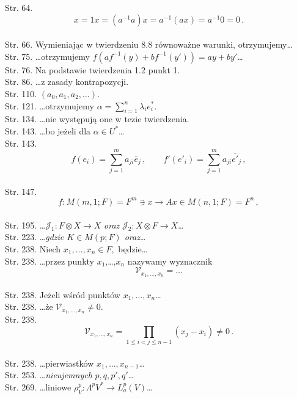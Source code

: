 \documentclass[a4paper,11pt]{article}
\begin{document}
Str. 64.
  $$x = 1 x = ( a^{ -1 } a ) x = a^{ -1 }( a x ) = a^{ -1 } 0 = 0 \,
  .$$ \\
Str. 66. Wymieniając w twierdzeniu 8.8 równoważne warunki,
otrzymujemy\ldots \\
Str. 75. \ldots otrzymujemy
$f( a f^{ -1 }( y ) + b f^{ -1 } ( y' ) ) = a y + b y'$\ldots \\
Str. 76. Na podstawie twierdzenia 1.2 punkt 1. \\
Str. 86. \ldots z zasady kontrapozycji. \\
Str. 110. $( a_{ 0 }, a_{ 1 }, a_{ 2 }, \ldots )$. \\
Str. 121. \ldots otrzymujemy
$\alpha = \sum_{ i = 1 }^{ n } \lambda_{ i } e^{ * }_{ i } .$ \\
Str. 134. \ldots nie występują one w tezie twierdzenia. \\
Str. 143. \ldots bo jeżeli dla $\alpha \in U^{ * }$\ldots \\
Str. 143.
  $$f( e_{ i } ) = \sum_{ j = 1 }^{ m } a_{ j i } \overline{ { e } }_{
    j } \, , \qquad f'( e'_{ i } ) = \sum_{ j = 1 }^{ m } a_{ j i } \overline{
    { e }' }_{ j } \, ,$$ \\
Str. 147.
$$f : M( m, 1; F ) = F^{ m } \ni x \longrightarrow A x \in M( n, 1 ;
F ) = F^{ n } \, ,$$ \\
Str. 195.
\ldots$\mathcal{ J }_{ 1 } : F \otimes X \rightarrow X$ \textit{oraz}
$\mathcal{ J }_{ 2 } : X \otimes F \rightarrow X$\ldots \\
Str. 223. \ldots\textit{gdzie $K \in M( p; F )$ oraz}\ldots \\
Str. 238. Niech $x_{ 1 }, \ldots, x_{ n } \in F ,$ będzie\ldots \\
Str. 238. \ldots przez punkty $x_{ 1 }$,\ldots,$x_{ n }$ nazywamy
wyznacznik
$$\mathcal{ V }_{ x_{ 1 }, \ldots, x_{ n } } = \ldots$$ \\
Str. 238. Jeżeli wśród punktów $x_{ 1 },\ldots, x_{ n }$\ldots \\
Str. 238. \ldots że $\mathcal{ V }_{ x_{ 1 }, \ldots, x_{ n } } \neq 0 .$ \\
Str. 238.
$$\mathcal{ V }_{ x_{ 1 }, \ldots, x_{ n } } = \prod_{ 1 \leq i < j
  \leq n - 1 }( x_{ j } - x_{ i } ) \neq 0 \, .$$ \\
Str. 238. \ldots pierwiastków $x_{ 1 }, \ldots, x_{ n - 1 }$\ldots \\
Str. 253. \ldots \textit{nieujemnych} $p, q, p', q'$\ldots \\
Str. 269. \ldots liniowe
$\rho_{ V }^{ p } : \Lambda^{ p } V^{ * } \rightarrow L^{ p }_{ a } ( V )$\ldots \\
\end{document}
